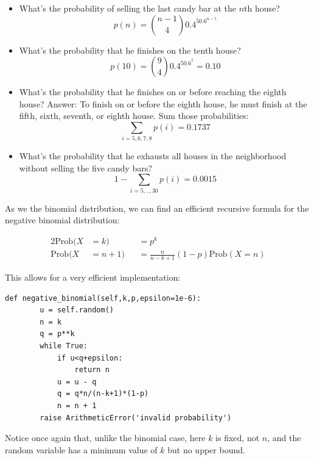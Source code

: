 \documentclass[justified,sixbynine]{tufte-book}
\def\ft{\small\tt}
\theoremstyle{plain}%
\theoremstyle{definition}
\theoremstyle{remark}
\begin{document}
\begin{fullwidth}
\begin{itemize}
\item  What's the probability of selling the last candy bar at the $n$th house?
\begin{equation}
p(n)=\binom{n-1}40.4^50.6^{n-5}
\end{equation}

\item  What's the probability that he finishes on the tenth house?
\begin{equation}
p(10)=\binom 940.4^50.6^5=0.10
\end{equation}

\item  What's the probability that he finishes on or before reaching the
eighth house? Answer: To finish on or before the eighth house, he must
finish at the fifth, sixth, seventh, or eighth house. Sum those
probabilities:
\begin{equation}
\sum_{i=5,6,7,8}p(i)=0.1737
\end{equation}

\item  What's the probability that he exhausts all houses in the
neighborhood without selling the five candy bars?
\begin{equation}
1-\sum_{i=5,..,30}p(i)=0.0015
\end{equation}
\end{itemize}

As we the binomial distribution, we can find an efficient recursive formula for the 
negative binomial distribution:

\begin{alignat}{2}
\textrm{Prob}(X &= k) &&= p^k \\
\textrm{Prob}(X &= n+1)&&= \frac{n}{n-k+1}(1-p)\textrm{Prob}(X=n)
\end{alignat}

This allows for a very efficient implementation:

\begin{lstlisting}[caption={in file: {\ft nlib.py}}]
    def negative_binomial(self,k,p,epsilon=1e-6):        
        u = self.random()
        n = k 
        q = p**k
        while True:
            if u<q+epsilon:
                return n
            u = u - q
            q = q*n/(n-k+1)*(1-p)
            n = n + 1
        raise ArithmeticError('invalid probability')
\end{lstlisting}

Notice once again that, unlike the binomial case, here $k$ is fixed, not $n$, and the random variable has a minimum value of $k$ but no upper bound.


\end{fullwidth}
\end{document}
